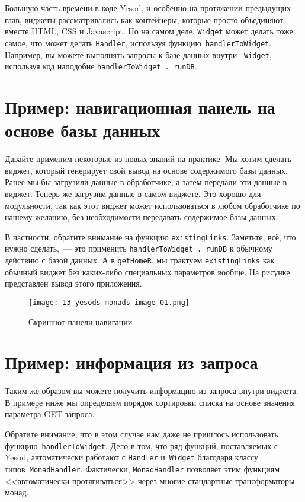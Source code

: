 Большую часть времени в коде Yesod, и особенно на протяжении предыдущих глав,
виджеты рассматривались как контейнеры, которые просто объединяют вместе HTML,
CSS и Javascript. Но на самом деле, \lstinline'Widget' может делать тоже самое,
что может делать \lstinline'Handler', используя
функцию~\lstinline'handlerToWidget'. Например, вы можете выполнять запросы
к базе данных внутри ~\lstinline'Widget', используя код наподобие
\lstinline'handlerToWidget . runDB'.

\section{Пример: навигационная панель на основе базы данных}
Давайте применим некоторые из новых знаний на практике. Мы хотим сделать виджет,
который генерирует свой вывод на основе содержимого базы данных. Ранее мы бы
загрузили данные в обработчике, а затем передали эти данные в виджет. Теперь же
загрузим данные в самом виджете. Это хорошо для модульности, так как этот виджет
может использоваться в любом обработчике по нашему желанию, без необходимости
передавать содержимое базы данных.


В частности, обратите внимание на функцию \lstinline'existingLinks'. Заметьте,
всё, что нужно сделать,~--- это применить \lstinline'handlerToWidget . runDB' к
обычному действию с базой данных. А в \lstinline'getHomeR', мы трактуем
\lstinline'existingLinks' как обычный виджет без каких-либо специальных
параметров вообще. На рисунке представлен вывод этого приложения.

\begin{figure}[tbh]
  \centering
  \texttt{[image: 13-yesods-monads-image-01.png]}
  \caption{Скриншот панели навигации}
\end{figure}

\section{Пример: информация из запроса}
Таким же образом вы можете получить информацию из запроса внутри виджета. В
примере ниже мы определяем порядок сортировки списка на основе значения
параметра GET-запроса.


Обратите внимание, что в этом случае нам даже не пришлось использовать
функцию~\lstinline'handlerToWidget'. Дело в том, что ряд функций, поставляемых
с Yesod, автоматически работают с \lstinline'Handler' и~\lstinline'Widget'
благодаря классу типов~\lstinline'MonadHandler'. Фактически,
\lstinline'MonadHandler' позволяет этим функциям <<автоматически
протягиваться>> через многие стандартные трансформаторы монад.

